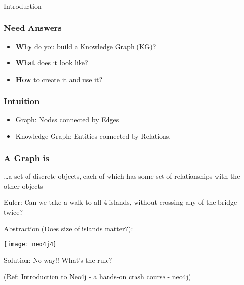 \begin{frame}[fragile]\frametitle{}
\begin{center}
{\Large Introduction}
\end{center}
\end{frame}

\begin{frame}[fragile]\frametitle{Need Answers}

\begin{itemize}
\item {\bf Why} do you build a Knowledge Graph (KG)?
\item {\bf What} does it look like?
\item {\bf How} to create it and use it?
\end{itemize}
	  
\end{frame}



\begin{frame}[fragile]\frametitle{Intuition}

\begin{itemize}
\item Graph: Nodes connected by Edges
\item Knowledge Graph: Entities connected by Relations.
\end{itemize}
	  
\end{frame}





\begin{frame}\frametitle{A Graph is}
{\emph \ldots a set of discrete objects, each of which has some set of relationships with the other objects}

Euler: Can we take a walk to all 4 islands, without crossing any of the bridge twice?

Abstraction (Does size of islands matter?):

\begin{center}
\texttt{[image: neo4j4]}
\end{center}	  

Solution: No way!! What's the rule?

{\tiny (Ref: Introduction to Neo4j - a hands-on crash course - neo4j)}
\end{frame}


